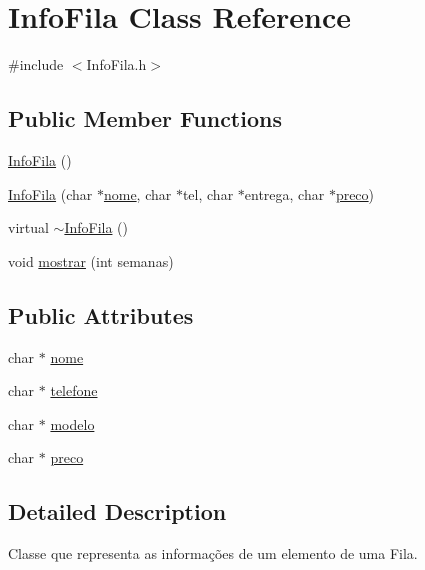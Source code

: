 \hypertarget{classInfoFila}{
\section{InfoFila Class Reference}
\label{classInfoFila}
}


{\ttfamily \#include $<$InfoFila.h$>$}

\subsection*{Public Member Functions}
\begin{DoxyCompactItemize}
\item 
\hyperlink{classInfoFila_a6a0d90a2bda334249efc3d4a3e5714c2}{InfoFila} ()
\item 
\hyperlink{classInfoFila_a5611dfa5016b4dbc789615ceb71d004e}{InfoFila} (char $\ast$\hyperlink{classInfoFila_acf4cfe03a2a0b010e53536d02aafae7d}{nome}, char $\ast$tel, char $\ast$entrega, char $\ast$\hyperlink{classInfoFila_a72e9667faf3a9c779e27811c15868d9c}{preco})
\item 
virtual \hyperlink{classInfoFila_aab019bfb81ebba0239526235b8638139}{$\sim$InfoFila} ()
\item 
void \hyperlink{classInfoFila_a24009b498f81ae2dd5263c71a6f0019d}{mostrar} (int semanas)
\end{DoxyCompactItemize}
\subsection*{Public Attributes}
\begin{DoxyCompactItemize}
\item 
char $\ast$ \hyperlink{classInfoFila_acf4cfe03a2a0b010e53536d02aafae7d}{nome}
\item 
char $\ast$ \hyperlink{classInfoFila_af9e1cef9a6da2e844d2ef97a115a1522}{telefone}
\item 
char $\ast$ \hyperlink{classInfoFila_aad74e3cb039d5f01ee37dbf773b07948}{modelo}
\item 
char $\ast$ \hyperlink{classInfoFila_a72e9667faf3a9c779e27811c15868d9c}{preco}
\end{DoxyCompactItemize}


\subsection{Detailed Description}
Classe que representa as informações de um elemento de uma Fila. 

